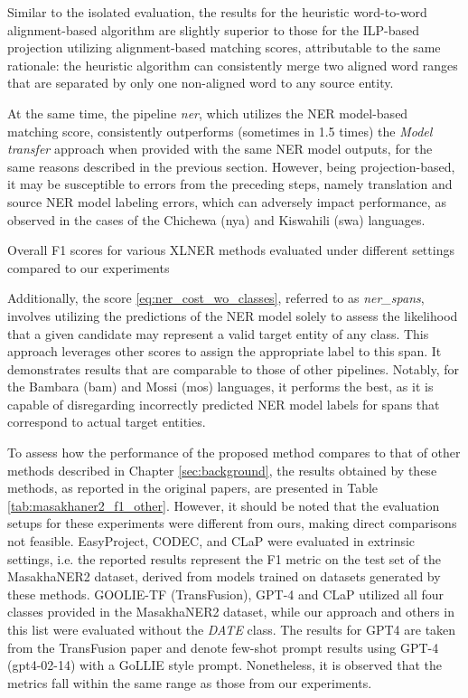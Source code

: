 Similar to the isolated evaluation, the results for the heuristic word-to-word
alignment-based algorithm are slightly superior to those for the ILP-based projection
utilizing alignment-based matching scores, attributable to the same rationale: the
heuristic algorithm can consistently merge two aligned word ranges that are separated
by only one non-aligned word to any source entity.

At the same time, the pipeline \textit{ner}, which utilizes the NER model-based matching
score, consistently outperforms (sometimes in 1.5 times) the \textit{Model transfer} approach when provided with the same
NER model outputs, for the same reasons described in the previous section. However,
being projection-based, it may be susceptible to errors from the preceding steps, namely
translation and source NER model labeling errors, which can adversely impact performance,
as observed in the cases of the Chichewa (nya) and Kiswahili (swa) languages.

\begin{table}[ht]
  
  \caption{Overall F1 scores for various XLNER methods evaluated under different
  settings compared to our experiments}
  \label{tab:masakhaner2_f1_other}
\end{table}

Additionally, the score \eqref{eq:ner_cost_wo_classes}, referred to as \textit{ner\_spans},
involves utilizing the predictions of the NER model solely to assess the likelihood
that a given candidate may represent a valid target entity of any class. This approach
leverages other scores to assign the appropriate label to this span.
It demonstrates results that are comparable to those of other pipelines.
Notably, for the Bambara (bam) and Mossi (mos) languages, it performs the best, as
it is capable of disregarding incorrectly predicted NER model labels for spans that
correspond to actual target entities.

To assess how the performance of the proposed method compares to that of other methods described
in Chapter \ref{sec:background}, the results obtained by these methods, as reported in the original
papers, are presented in Table \ref{tab:masakhaner2_f1_other}. However, it should be noted that the
evaluation setups for these experiments were different from ours, making direct comparisons not feasible.
EasyProject, CODEC, and CLaP were evaluated in extrinsic settings, i.e. the reported results represent the
F1 metric on the test set of the MasakhaNER2 dataset, derived from models trained on datasets generated
by these methods. GOOLIE-TF (TransFusion), GPT-4 and CLaP utilized all four classes provided in the MasakhaNER2 dataset,
while our approach and others in this list were evaluated without the \textit{DATE} class.
The results for GPT4 are taken from the TransFusion paper \cite{transfusion} and denote few-shot
prompt results using GPT-4 (gpt4-02-14) with a GoLLIE \cite{sainz2024gollieannotationguidelinesimprove} style prompt.
Nonetheless, it is observed that the metrics fall within the same range as those from our experiments.
